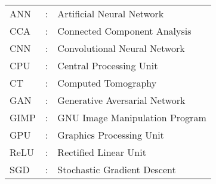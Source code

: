 \begin{tabular}{lcl}
ANN                 &:     & Artificial Neural Network \\
CCA                 &:     & Connected Component Analysis \\
CNN                 &:     & Convolutional Neural Network \\
CPU                 &:     & Central Processing Unit \\
CT                  &:     & Computed Tomography \\
GAN                 &:     & Generative Aversarial Network \\
GIMP                &:     & GNU Image Manipulation Program \\
GPU                 &:     & Graphics Processing Unit \\
ReLU                &:     & Rectified Linear Unit \\
SGD                 &:     & Stochastic Gradient Descent \\
\end{tabular}